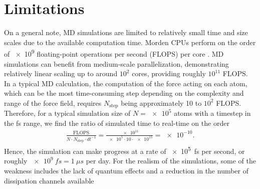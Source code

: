 




\section{Limitations}
On a general note, \acrshort{MD} simulations are limited to relatively small
time and size scales due to the available computation time. Morden CPUs perform
on the order of \num{e9} floating-point operations per second (FLOPS) per core
\cite{Vanossi_2013}. \acrshort{MD} simulations can benefit from medium-scale
parallelization, demonstrating relatively linear scaling up to around $10^2$
cores, providing roughly $10^{11}$ FLOPS. In a typical \acrshort{MD} calculation, the computation of the force acting on each atom, which can be the most time-consuming step depending on the complexity and range of the force field, requires $N_{\text{step}}$ being approximately 10 to $10^2$ FLOPS. Therefore, for a typical simulation size of $N = \num{e5}$ atoms with a timestep in the fs range, we find the ratio of simulated time to real-time on the order 
\begin{align*}
  \frac{\text{FLOPS}}{N\cdot N_{\text{step}} \cdot dt^{-1}} = \frac{\num{e11}}{\num{e5}\cdot 10 \cdot \num{e15}} = \num{e-10}.
\end{align*}
Hence, the simulation can make progress at a rate of \SI{e5}{fs} per second, or roughly $\SI{e9}{fs}=\SI{1}{\mu s}$ per day. For the realism of the simulations, some of the weakness includes the lack of quantum effects and a reduction in the number of dissipation channels available



